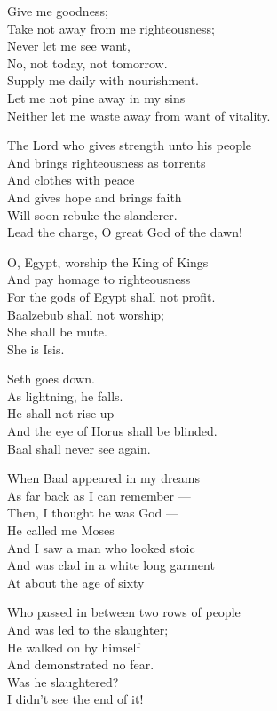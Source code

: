 \documentclass[
]{book}
\begin{document}
Give me goodness;\\
Take not away from me righteousness;\\
Never let me see want,\\
No, not today, not tomorrow.\\
Supply me daily with nourishment.\\
Let me not pine away in my sins\\
Neither let me waste away from want of vitality.

The Lord who gives strength unto his people\\
And brings righteousness as torrents\\
And clothes with peace\\
And gives hope and brings faith\\
Will soon rebuke the slanderer.\\
Lead the charge, O great God of the dawn!

O, Egypt, worship the King of Kings\\
And pay homage to righteousness\\
For the gods of Egypt shall not profit.\\
Baalzebub shall not worship;\\
She shall be mute.\\
She is Isis.

Seth goes down.\\
As lightning, he falls.\\
He shall not rise up\\
And the eye of Horus shall be blinded.\\
Baal shall never see again.

When Baal appeared in my dreams\\
As far back as I can remember ---\\
Then, I thought he was God ---\\
He called me Moses\\
And I saw a man who looked stoic\\
And was clad in a white long garment\\
At about the age of sixty

Who passed in between two rows of people\\
And was led to the slaughter;\\
He walked on by himself\\
And demonstrated no fear.\\
Was he slaughtered?\\
I didn't see the end of it!
\end{document}
